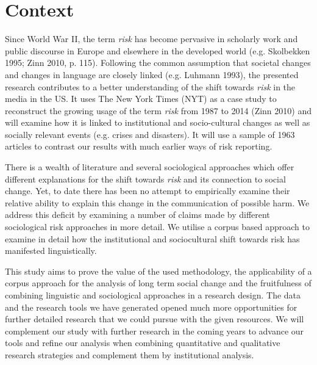 \documentclass{report}
\begin{document}
    \cleardoublepage
    \singlespacing
    \tableofcontents
    \onehalfspacing
    \cleardoublepage

\chapter{Context} %

Since World War II, the term \emph{risk} has become pervasive in scholarly work and public discourse in Europe and elsewhere in the developed world (e.g. Skolbekken 1995; Zinn 2010, p. 115). Following the common assumption that societal changes and changes in language are closely linked (e.g. Luhmann 1993), the presented research contributes to a better understanding of the shift towards \emph{risk} in the media in the US. It uses The New York Times (NYT) as a case study to reconstruct the growing usage of the term \emph{risk} from 1987 to 2014 (Zinn 2010) and will examine how it is linked to institutional and socio-cultural changes as well as socially relevant events (e.g. crises and disasters). It will use a sample of 1963 articles to contrast our results with much earlier ways of risk reporting. 

There is a wealth of literature and several sociological approaches which offer different explanations for the shift towards \emph{risk} and its connection to social change. Yet, to date there has been no attempt to empirically examine their relative ability to explain this change in the communication of possible harm. We address this deficit by examining a number of claims made by different sociological risk approaches in more detail. We utilise a corpus based approach to examine in detail how the institutional and sociocultural shift towards risk has manifested linguistically.

This study aims to prove the value of the used methodology, the applicability of a corpus approach for the analysis of long term social change and the fruitfulness of combining linguistic and sociological approaches in a research design. The data and the research tools we have generated opened much more opportunities for further detailed research that we could pursue with the given resources. We will complement our study with further research in the coming years to advance our tools and refine our analysis when combining quantitative and qualitative research strategies and complement them by institutional analysis.
\end{document}
